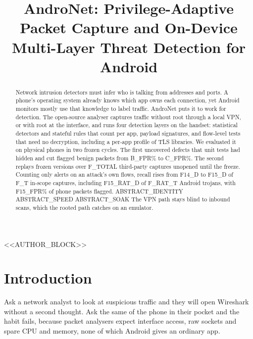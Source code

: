 \documentclass[runningheads]{llncs}
\begin{document}
\title{AndroNet: Privilege-Adaptive Packet Capture and On-Device Multi-Layer Threat Detection for Android}

<<AUTHOR_BLOCK>>

\maketitle

\begin{abstract}
Network intrusion detectors must infer who is talking from addresses and ports. A phone's operating system already knows which app owns each connection, yet Android monitors mostly use that knowledge to label traffic. AndroNet puts it to work for detection. The open-source analyser captures traffic without root through a local VPN, or with root at the interface, and runs four detection layers on the handset: statistical detectors and stateful rules that count per app, payload signatures, and flow-level tests that need no decryption, including a per-app profile of TLS libraries. We evaluated it on physical phones in two frozen cycles. The first uncovered defects that unit tests had hidden and cut flagged benign packets from {{B_FPR}}\% to {{C_FPR}}\%. The second replays frozen versions over {{F_TOTAL}} third-party captures unopened until the freeze. Counting only alerts on an attack's own flows, recall rises from {{F14_D}} to {{F15_D}} of {{F_T}} in-scope captures, including {{F15_RAT_D}} of {{F_RAT_T}} Android trojans, with {{F15_FPR}}\% of phone packets flagged. {{ABSTRACT_IDENTITY}} {{ABSTRACT_SPEED}} {{ABSTRACT_SOAK}} The VPN path stays blind to inbound scans, which the rooted path catches on an emulator.

\end{abstract}

\section{Introduction}

Ask a network analyst to look at suspicious traffic and they will open Wireshark without a second thought. Ask the same of the phone in their pocket and the habit fails, because packet analysers expect interface access, raw sockets and spare CPU and memory, none of which Android gives an ordinary app.
\end{document}
